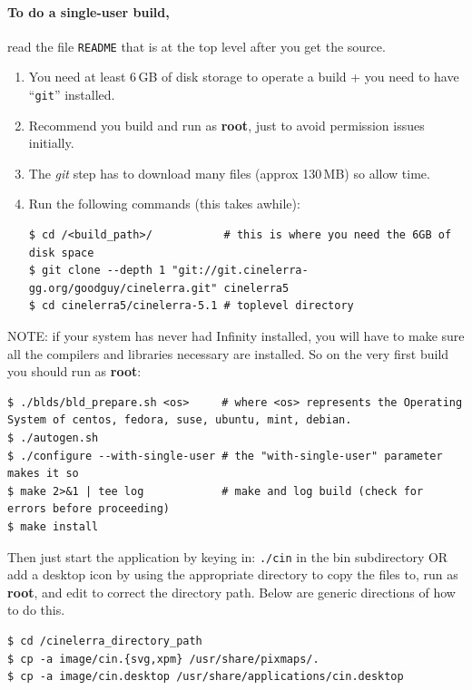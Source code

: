 \paragraph{To do a single-user build,} read the file \texttt{README} that is at the top level after you get the source.
\begin{enumerate}
    \item  You need at least 6\,GB of disk storage to operate a build + you need to have  “\texttt{git}” installed.
    \item  Recommend you build and run as \textbf{root}, just to avoid permission issues initially.
    \item  The \textit{git} step has to download many files (approx 130\,MB) so allow time.
    \item  Run the following commands (this takes awhile):
        \begin{lstlisting}[numbers=none]
$ cd /<build_path>/           # this is where you need the 6GB of disk space
$ git clone --depth 1 "git://git.cinelerra-gg.org/goodguy/cinelerra.git" cinelerra5 
$ cd cinelerra5/cinelerra-5.1 # toplevel directory
        \end{lstlisting}
\end{enumerate}

NOTE: if your system has never had \CGG{} Infinity installed, you will have to make sure all
the compilers and libraries necessary are installed. So on the very first build you should run as \textbf{root}:

\begin{lstlisting}[numbers=none]
$ ./blds/bld_prepare.sh <os>     # where <os> represents the Operating System of centos, fedora, suse, ubuntu, mint, debian.
$ ./autogen.sh
$ ./configure --with-single-user # the "with-single-user" parameter makes it so
$ make 2>&1 | tee log            # make and log build (check for errors before proceeding)
$ make install
\end{lstlisting}

Then just start the application by keying in: \texttt{./cin} in the bin subdirectory OR add a desktop icon by
using the appropriate directory to copy the files to, run as \textbf{root}, and edit to correct
the directory path.  Below are generic directions of how to do this.

\begin{lstlisting}[numbers=none]
$ cd /cinelerra_directory_path
$ cp -a image/cin.{svg,xpm} /usr/share/pixmaps/.
$ cp -a image/cin.desktop /usr/share/applications/cin.desktop
\end{lstlisting}

